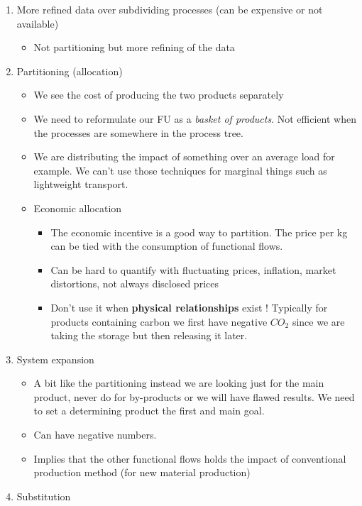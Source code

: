 \begin{enumerate}
\def\labelenumi{\arabic{enumi}.}
\tightlist
\item
  More refined data over subdividing processes (can be expensive or not
  available)

  \begin{itemize}
  \tightlist
  \item
    Not partitioning but more refining of the data
  \end{itemize}
\item
  Partitioning (allocation)

  \begin{itemize}
  \tightlist
  \item
    We see the cost of producing the two products separately
  \item
    We need to reformulate our FU as a \emph{basket of products}. Not
    efficient when the processes are somewhere in the process tree.
  \item
    We are distributing the impact of something over an average load for
    example. We can't use those techniques for marginal things such as
    lightweight transport.
  \item
    Economic allocation

    \begin{itemize}
    \tightlist
    \item
      The economic incentive is a good way to partition. The price per
      kg can be tied with the consumption of functional flows.
    \item
      Can be hard to quantify with fluctuating prices, inflation, market
      distortions, not always disclosed prices
    \item
      Don't use it when \textbf{physical relationships} exist !
      Typically for products containing carbon we first have negative
      \(CO_2\) since we are taking the storage but then releasing it
      later.
    \end{itemize}
  \end{itemize}
\item
  System expansion

  \begin{itemize}
  \tightlist
  \item
    A bit like the partitioning instead we are looking just for the main
    product, never do for by-products or we will have flawed results. We
    need to set a determining product the first and main goal.
  \item
    Can have negative numbers.
  \item
    Implies that the other functional flows holds the impact of
    conventional production method (for new material production)
  \end{itemize}
\item
  Substitution


\end{enumerate}
